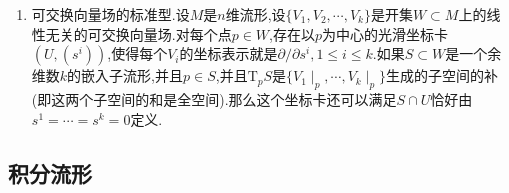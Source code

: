 \begin{enumerate}
\begin{proof}
		设$V,W$是流形$M$上的向量场,它们的流分别记作$\theta,\psi$.先设$V,W$可交换.取$p\in M$,取$J,K$是包含0的开区间,使得$\psi_s\circ\theta_t(p)$对全部$(s,t)\in J\times K$有意义.按照$V,W$可交换说明$V$是在$\psi$下不变的.固定$s\in J$,考虑曲线$\gamma:K\to M$为$\gamma(t)=\psi_s\circ\theta_t(p)=\psi_s(\theta^{(p)}(t))$.这条曲线满足$\gamma(0)=\psi_s(p)$,并且它在$t\in K$处的速度为:
		$$\gamma'(t)=\frac{\mathrm{d}}{\mathrm{d}t}(\psi_s(\theta^{(p)}(t)))=\mathrm{d}(\psi_s)((\theta^{(p)})'(t))=\mathrm{d}(\psi_s)(V_{\theta^{(p)}}(t))=V_{\gamma(t)}$$
		
		于是$\gamma$是$V$的一条以$\psi_s(p)$为起始点的积分曲线.按照积分曲线的唯一性定理得到$\gamma(t)=\theta^{\psi_s(p)}(t)=\theta_t(\psi_s(p))$.这说明另一侧的复合在$J\times K$上有意义并且二者相同.
		
		反过来假设两个流$\theta,\psi$可交换.任取$p\in M$,选取$\varepsilon>0$使得$\psi_s\circ\theta_t(p)$在$|s|,|t|<\varepsilon$上总存在.那么可交换性保证$\psi_s\circ\theta_t(p)=\theta_t\circ\psi_s(p)$对$|s|,|t|<\varepsilon$总成立.也即有:
		$$\psi^{\theta_t(p)}(s)=\theta_t(\psi^{(p)}(s))$$
		
		对这个等式两侧对$s$求导得到:
		$$W_{\theta_t(p)}=\frac{\mathrm{d}}{\mathrm{d}s}\mid_{s=0}\psi^{\theta_t(p)}(s)=\frac{\mathrm{d}}{\mathrm{d}s}\mid_{s=0}\theta_t(\psi^{(p)}(s))=\mathrm{d}(\theta_t)_p(W_p)$$
		
		等式两侧作用$\mathrm{d}(\theta_{-t})_{\theta_t(p)}$,得到$\mathrm{d}(\theta_{-t})_{\theta_t(p)}(W_{\theta_t(p)})=W_p$.再对$t$求导,按照李导数的定义式就得到$(\mathscr{L}_VW)_p=0$,于是$\mathscr{L}_VW\equiv0$,也即$V,W$可交换.
	\end{proof}
	\item 可交换向量场的标准型.设$M$是$n$维流形,设$\{V_1,V_2,\cdots,V_k\}$是开集$W\subset M$上的线性无关的可交换向量场.对每个点$p\in W$,存在以$p$为中心的光滑坐标卡$(U,(s^i))$,使得每个$V_i$的坐标表示就是$\partial/\partial s^i,1\le i\le k$.如果$S\subset W$是一个余维数$k$的嵌入子流形,并且$p\in S$,并且$\mathrm{T}_pS$是$\{V_1\mid_p,\cdots,V_k\mid_p\}$生成的子空间的补(即这两个子空间的和是全空间).那么这个坐标卡还可以满足$S\cap U$恰好由$s^1=\cdots=s^k=0$定义.
\end{enumerate}

\subsection{积分流形}

